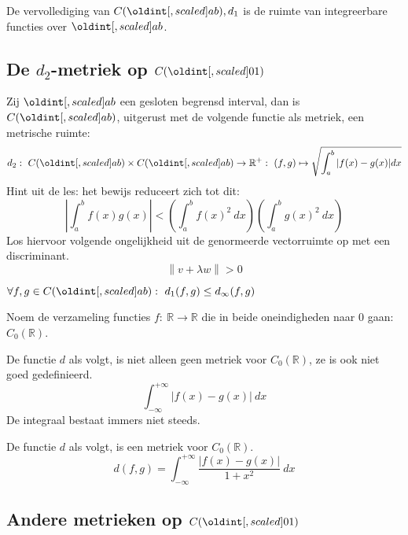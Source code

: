 \documentclass[main.tex]{subfiles}
\begin{document}
\begin{vb}
  De vervollediging van $C(\interval{a}{b}),d_{1}$ is de ruimte van integreerbare functies over $\interval{a}{b}$.
\end{vb}

\subsection{De $d_2$-metriek op $C(\interval{0}{1})$}
\label{sec:de-d_2-metriek}

\begin{vb}
  Zij $\interval{a}{b}$ een gesloten begrensd interval, dan is $C(\interval{a}{b})$, uitgerust met de volgende functie als metriek, een metrische ruimte:
  \[ d_{2}:\ C(\interval{a}{b})\times C(\interval{a}{b}) \rightarrow \mathbb{R}^{+}:\ (f,g) \mapsto \sqrt{\int_{a}^{b}|f(x)-g(x)|dx} \]
  Hint uit de les: het bewijs reduceert zich tot dit:
  \[ \left|\int_{a}^{b}f(x)g(x)\right| < \left(\int_{a}^{b}f(x)^{2}\ dx \right) \left(\int_{a}^{b}g(x)^{2}\ dx \right) \]
  Los hiervoor volgende ongelijkheid uit de genormeerde vectorruimte op met een discriminant.
  \[ \left\| v+\lambda w \right\| > 0 \]
\end{vb}

\begin{st}
  $\forall f,g \in C(\interval{a}{b}):\ d_{1}(f,g) \le d_{\infty}(f,g)$
\end{st}

\begin{de}
  Noem de verzameling functies $f:\ \mathbb{R} \rightarrow \mathbb{R}$ die in beide oneindigheden naar $0$ gaan: $C_{0}(\mathbb{R})$.
\end{de}

\begin{vb}
  De functie $d$ als volgt, is niet alleen geen metriek voor $C_{0}(\mathbb{R})$, ze is ook niet goed gedefinieerd.
  \[ \int_{-\infty}^{+\infty}|f(x)-g(x)|\ dx \]
  De integraal bestaat immers niet steeds.
\end{vb}

\begin{vb}
  De functie $d$ als volgt, is een metriek voor $C_{0}(\mathbb{R})$.
  \[ d(f,g) = \int_{-\infty}^{+\infty}\frac{|f(x)-g(x)|}{1+x^{2}}\ dx \]
\end{vb}

\subsection{Andere metrieken op $C(\interval{0}{1})$}
\label{sec:andere-metrieken-op}
\end{document}
